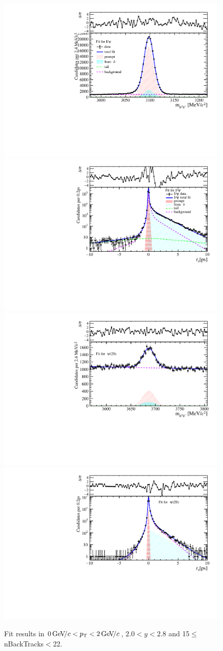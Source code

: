 \begin{figure}[H]
\begin{center}
\includegraphics[width=0.47\linewidth]{pdf/Jpsi/drawmassB/n3y1pt1.pdf}
\includegraphics[width=0.47\linewidth]{pdf/Jpsi/2DFitB/n3y1pt1.pdf}
\vspace*{-0.5cm}
\includegraphics[width=0.47\linewidth]{pdf/Psi2S/drawmassB/n3y1pt1.pdf}
\includegraphics[width=0.47\linewidth]{pdf/Psi2S/2DFitB/n3y1pt1.pdf}
\vspace*{-0.5cm}
\end{center}
\caption{Fit results in $0\text{\,Ge\kern -0.1em V\!/}c<p_{\mathrm{T}}<2\text{\,Ge\kern -0.1em V\!/}c$, $2.0<y<2.8$ and 15$\leq$nBackTracks$<$22.}
\label{Fitn3y1pt1}
\end{figure}
